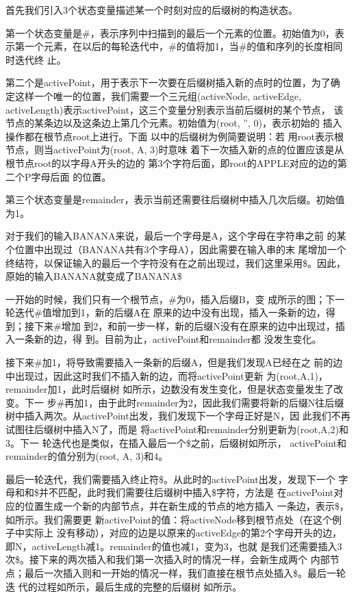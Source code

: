 首先我们引入3个状态变量描述某一个时刻对应的后缀树的构造状态。

第一个状态变量是{\#}，表示序列中扫描到的最后一个元素的位置。初始值为0，表
示第一个元素，在以后的每轮迭代中，\#的值将加1，当\#的值和序列的长度相同时迭代终
止。
  
第二个是{activePoint}，用于表示下一次要在后缀树插入新的点时的位置，为了确
定这样一个唯一的位置，我们需要一个三元组{(activeNode, activeEdge,
  activeLength)}表示{activePoint}，这三个变量分别表示当前后缀树的某个节点，
该节点的某条边以及这条边上第几个元素。初始值为{(root, '', 0)}，表示初始的
插入操作都在根节点{root}上进行。下面
以中的后缀树为例简要说明：若
用{root}表示根节点，则当{activePoint}为{(root, A, 3)}时意味
着下一次插入新的点的位置应该是从根节点{root}的以字母{A}开头的边的
第3个字符后面，即{root}的{APPLE}对应的边的第二个{P}字母后面
的位置。
  
第三个状态变量是{remainder}，表示当前还需要往后缀树中插入几次后缀。初始值
为1。

对于我们的输入{BANANA}来说，最后一个字母是{A}，这个字母在字符串之前
的某个位置中出现过（{BANANA}共有3个字母{A}），因此需要在输入串的末
尾增加一个终结符，以保证输入的最后一个字符没有在之前出现过，我们这里采用\$。因此，
原始的输入{BANANA}就变成了{BANANA\$}

一开始的时候，我们只有一个根节点，\#为0，插入后缀{B}，变
成所示的图；下一轮迭代\#值增加到1，新的后缀{A}在
原来的边中没有出现，插入一条新的边，得到；接下来\#增加
到2，和前一步一样，新的后缀{N}没有在原来的边中出现过，插入一条新的边，得
到。目前为止，{activePoint}和{remainder}都
没发生变化。

接下来\#加1，将导致需要插入一条新的后缀{A}，但是我们发现{A}已经在之
前的边中出现过，因此这时我们不插入新的边，而将{activePoint}更新
为{(root,A,1)}，{remainder}加1，此时后缀树
如所示，边数没有发生变化，但是状态变量发生了改变。下一
步\#再加1，由于此时{remainder}为2，因此我们需要将新的后缀{N}往后缀
树中插入两次。从{activePoint}出发，我们发现下一个字母正好是{N}，因
此我们不再试图往后缀树中插入{N}了，而是
将{activePoint}和{remainder}分别更新为{(root,A,2)}和3。下一
轮迭代也是类似，在插入最后一个\$之前，后缀树如所示，
{activePoint}和{remainder}的值分别为{(root, A, 3)}和4。


最后一轮迭代，我们需要插入终止符\$。从此时的{activePoint}出发，发现下一个
字母和和\$并不匹配，此时我们需要往后缀树中插入\$字符，方法是
在{activePoint}对应的位置生成一个新的内部节点，并在新生成的节点的地方插入
一条边，表示\$，如所示。我们需要更
新{activePoint}的值：将{activeNode}移到根节点处（在这个例子中实际上
没有移动），对应的边是以原来的{activeEdge}的第2个字母开头的边，
即{N}，{activeLength}减1。{remainder}的值也减1，变为3，也就
是我们还需要插入3次\$。接下来的两次插入和我们第一次插入时的情况一样，会新生成两个
内部节点；最后一次插入则和一开始的情况一样，我们直接在根节点处插入\$。最后一轮迭
代的过程如所示，最后生成的完整的后缀树
如所示。

